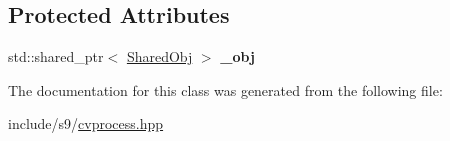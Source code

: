 \subsection*{\-Protected \-Attributes}
\begin{DoxyCompactItemize}
\item 
\hypertarget{classs9_1_1compvis_1_1Process_a3c7111cbde85ba9a894a7613d1fbb24e}{std\-::shared\-\_\-ptr$<$ \hyperlink{structs9_1_1compvis_1_1Process_1_1SharedObj}{\-Shared\-Obj} $>$ {\bfseries \-\_\-obj}}\label{classs9_1_1compvis_1_1Process_a3c7111cbde85ba9a894a7613d1fbb24e}

\end{DoxyCompactItemize}


\-The documentation for this class was generated from the following file\-:\begin{DoxyCompactItemize}
\item 
include/s9/\hyperlink{cvprocess_8hpp}{cvprocess.\-hpp}\end{DoxyCompactItemize}

